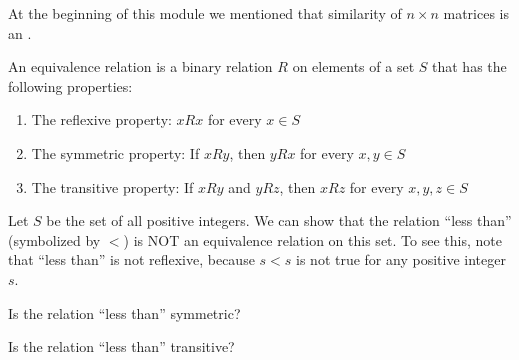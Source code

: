 \documentclass{ximera}
\begin{document}
\begin{problem}\label{prob:lessthan}
At the beginning of this module we mentioned that similarity of $n \times n$ matrices is an .

An equivalence relation is a binary relation $R$ on elements of a set $S$ that has the following properties:
\begin{enumerate}
\item The reflexive property:  $x R x$ for every $x \in S$
\item The symmetric property:  If $x R y$, then $y R x$ for every $x,y \in S$
\item The transitive property:  If $x R y$ and $y R z$, then $x R z$ for every $x,y,z \in S$
\end{enumerate}

Let $S$ be the set of all positive integers.  We can show that the relation ``less than'' (symbolized by $<$) is NOT an equivalence relation on this set.  To see this, note that ``less than'' is not reflexive, because $s<s$ is not true for any positive integer $s$.

\begin{problem}
Is the relation ``less than'' symmetric?
\end{problem}

\begin{problem}
Is the relation ``less than'' transitive?
\end{problem}

\end{problem}
\end{document}
